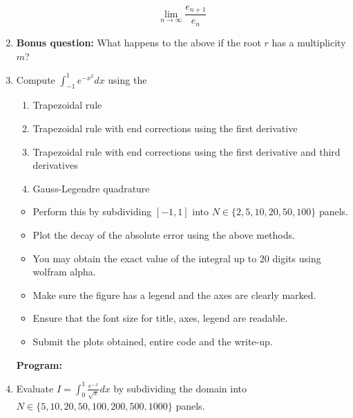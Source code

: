 \documentclass[a4paper,11pt]{report}
\begin{document}
\begin{enumerate}
        \begin{equation*}
        \lim_{n \rightarrow \infty} \frac{e_{n+1}}{e_{n}}
        \end{equation*}

    \item \textbf{Bonus question:} What happens to the above if the root $r$ has a
    multiplicity $m$?

    \item Compute $\displaystyle \int_{-1}^{1} e^{-x^{2}} dx$ using the

    \begin{enumerate}
    \item Trapezoidal rule
    \item Trapezoidal rule with end corrections using the first derivative
    \item Trapezoidal rule with end corrections using the first derivative and third
    derivatives
    \item Gauss-Legendre quadrature
    \end{enumerate}

    \begin{itemize}
    \item Perform this by subdividing $[-1, 1]$ into $N \in \{2, 5, 10, 20, 50, 100\}$ 
    panels.
    \item Plot the decay of the absolute error using the above methods.
    \item You may obtain the exact value of the integral up to $20$ digits using
    wolfram alpha.
    \item Make sure the figure has a legend and the axes are clearly marked.
    \item Ensure that the font size for title, axes, legend are readable.
    \item Submit the plots obtained, entire code and the write-up.
    \end{itemize}
        
    \textbf{Program:}
    

    \begin{figure}[ht!]
    \centering
    \resizebox{0.9\linewidth}{!}{}
    \end{figure}

    \item Evaluate $I = \displaystyle \int_{0}^{1} \frac{e^{-x}}{\sqrt{x}} dx$ by
    subdividing the domain into $N \in \{5, 10, 20, 50, 100, 200, 500, 1000\}$ panels.


\end{enumerate}
\end{document}
